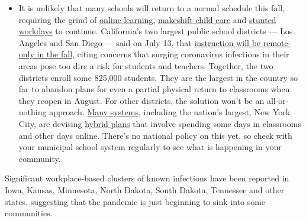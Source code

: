 \begin{itemize}
  \begin{itemize}
  \tightlist
  \item
    It is unlikely that many schools will return to a normal schedule
    this fall, requiring the grind of
    \href{https://www.nytimes.com/2020/06/05/us/coronavirus-education-lost-learning.html?action=click\&pgtype=Article\&state=default\&region=MAIN_CONTENT_3\&context=storylines_faq}{online
    learning},
    \href{https://www.nytimes.com/2020/05/29/us/coronavirus-child-care-centers.html?action=click\&pgtype=Article\&state=default\&region=MAIN_CONTENT_3\&context=storylines_faq}{makeshift
    child care} and
    \href{https://www.nytimes.com/2020/06/03/business/economy/coronavirus-working-women.html?action=click\&pgtype=Article\&state=default\&region=MAIN_CONTENT_3\&context=storylines_faq}{stunted
    workdays} to continue. California's two largest public school
    districts --- Los Angeles and San Diego --- said on July 13, that
    \href{https://www.nytimes.com/2020/07/13/us/lausd-san-diego-school-reopening.html?action=click\&pgtype=Article\&state=default\&region=MAIN_CONTENT_3\&context=storylines_faq}{instruction
    will be remote-only in the fall}, citing concerns that surging
    coronavirus infections in their areas pose too dire a risk for
    students and teachers. Together, the two districts enroll some
    825,000 students. They are the largest in the country so far to
    abandon plans for even a partial physical return to classrooms when
    they reopen in August. For other districts, the solution won't be an
    all-or-nothing approach.
    \href{https://bioethics.jhu.edu/research-and-outreach/projects/eschool-initiative/school-policy-tracker/}{Many
    systems}, including the nation's largest, New York City, are
    devising
    \href{https://www.nytimes.com/2020/06/26/us/coronavirus-schools-reopen-fall.html?action=click\&pgtype=Article\&state=default\&region=MAIN_CONTENT_3\&context=storylines_faq}{hybrid
    plans} that involve spending some days in classrooms and other days
    online. There's no national policy on this yet, so check with your
    municipal school system regularly to see what is happening in your
    community.
  \end{itemize}
\end{itemize}

Significant workplace-based clusters of known infections have been
reported in Iowa, Kansas, Minnesota, North Dakota, South Dakota,
Tennessee and other states, suggesting that the pandemic is just
beginning to sink into some communities.

